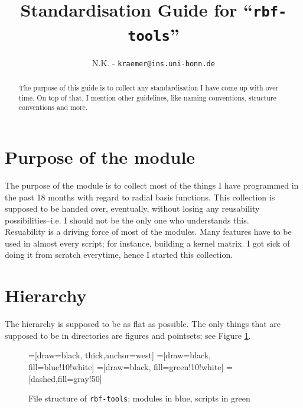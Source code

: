 \documentclass[12pt]{article}
\title{Standardisation Guide for ``\texttt{rbf-tools}''}
\author{N.K. - \texttt{kraemer@ins.uni-bonn.de}}
\begin{document}
\maketitle
\begin{abstract}
The purpose of this guide is to collect any standardisation I have come up with over time. On top of that, I mention other guidelines, like naming conventions, structure conventions and more. 
\end{abstract}
\begin{figure}[h]
\centering
\begin{minipage}{0.5\textwidth}
\tableofcontents
\end{minipage}
\end{figure}




\section{Purpose of the module}

The purpose of the module is to collect most of the things I have programmed in the past 18 months with regard to radial basis functions. This collection is supposed to be handed over, eventually, without losing any reusability possibilities--i.e. I should not be the only one who understands this.\\

Resuability is a driving force of most of the modules. Many features have to be used in almost every script; for instance, building a kernel matrix. I got sick of doing it from scratch everytime, hence I started this collection.


\section{Hierarchy}
The hierarchy is supposed to be as flat as possible. The only things that are supposed to be in directories are figures and pointsets; see Figure \ref{fig:hierarchy}.

\begin{figure}[h]
\centering
{}=[draw=black, thick,anchor=west]
=[draw=black, fill=blue!10!white]
=[draw=black, fill=green!10!white]
=[dashed,fill=gray!50]
\caption{File structure of \texttt{rbf-tools}; modules in blue, scripts in green}
\label{fig:hierarchy}
\end{figure}
\end{document}
